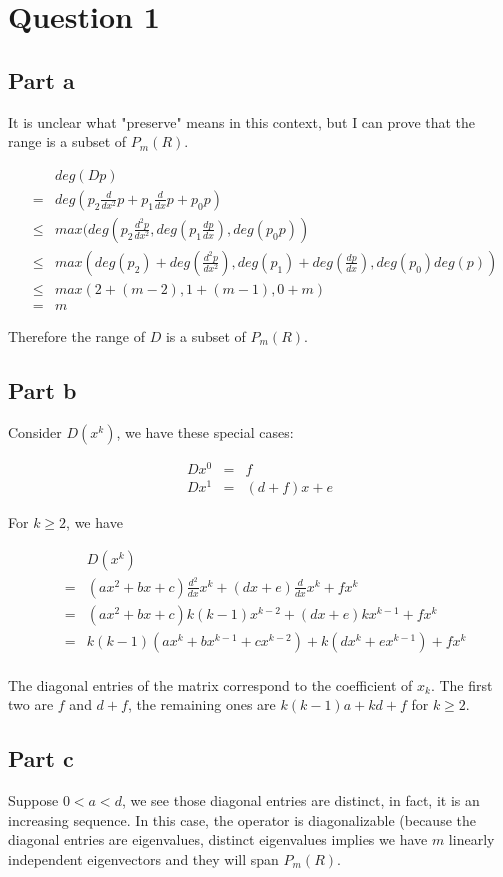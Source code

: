 \section*{Question 1}
\subsection*{Part a}
It is unclear what "preserve" means in this context, but I can prove that the range is a subset of $ P_m(R) $. 

\begin{eqnarray*}
  & & deg(D p) \\
  &=& deg(p_2 \frac{d}{dx^2}p + p_1 \frac{d}{dx}p + p_0 p ) \\
  &\le& max(deg(p_2 \frac{d^2p}{dx^2}, deg(p_1 \frac{dp}{dx}), deg(p_0 p )) \\
  &\le& max(deg(p_2)+deg(\frac{d^2p}{dx^2}), deg(p_1)+deg(\frac{dp}{dx}), deg(p_0)deg(p)) \\
  &\le& max(2+(m-2), 1+(m-1), 0 + m) \\
  &=& m  
\end{eqnarray*}

Therefore the range of $ D $ is a subset of $ P_m(R) $.

\subsection*{Part b}
Consider $ D(x^k) $, we have these special cases:

\begin{eqnarray*}
  D x^0 &=& f \\
  D x^1 &=& (d + f)x + e
\end{eqnarray*}

For $ k \ge 2 $, we have

\begin{eqnarray*}
  & & D(x^k) \\
  &=& (ax^2 + bx + c)\frac{d^2}{dx}x^k + (dx + e)\frac{d}{dx}x^k + fx^k \\
  &=& (ax^2 + bx + c)k(k-1)x^{k-2} + (dx + e)kx^{k-1} + fx^k \\
  &=& k(k-1)(ax^k + bx^{k-1} + cx^{k-2}) + k(dx^k + ex^{k-1}) + fx^k \\
\end{eqnarray*}

The diagonal entries of the matrix correspond to the coefficient of $ x_k $. The first two are $ f $ and $ d + f $, the remaining ones are $ k(k-1)a + kd +f $ for $ k \ge 2 $.
\subsection*{Part c}
Suppose $ 0 < a < d $, we see those diagonal entries are distinct, in fact, it is an increasing sequence. In this case, the operator is diagonalizable (because the diagonal entries are eigenvalues, distinct eigenvalues implies we have $ m $ linearly independent eigenvectors and they will span $ P_m(R) $.

